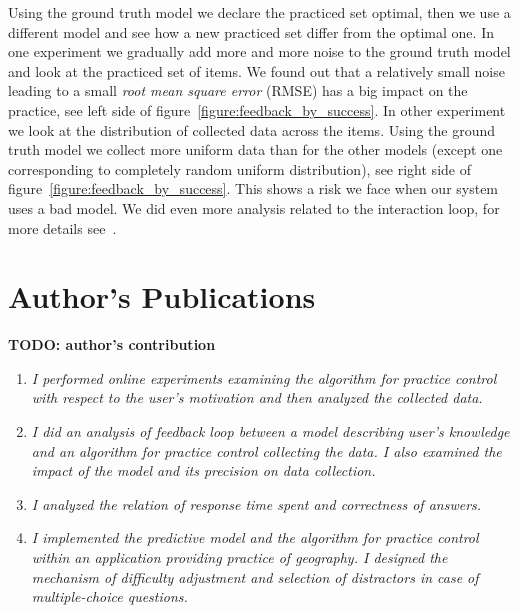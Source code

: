 \documentclass[table,color,cover,twoside,nolot,nolof]{fithesis3/fithesis3}
\begin{document}
Using the ground truth model we declare the practiced set
optimal, then we use a different model and see how a new practiced set
differ from the optimal one. In one experiment we gradually add more and more
noise to the ground truth model and look at the practiced set of items. We
found out that a relatively small noise leading to a small \emph{root mean
square error} (RMSE) has a big impact on the practice, see left side of
figure~\ref{figure:feedback_by_success}. In other experiment we look at the
distribution of collected data across the items. Using the ground truth model
we collect more uniform data than for the other models (except one
corresponding to completely random uniform distribution), see right side of
figure~\ref{figure:feedback_by_success}. This shows a risk we face when our
system uses a bad model. We did even more analysis related to the interaction
loop, for more details see~\cite{niznan2015exploring}.

\chapter{Author's Publications}

\textbf{TODO: author's contribution}

\begin{enumerate}
	\item {}

		\textit{I performed online experiments examining the algorithm for practice
			control with respect to the user's motivation and then analyzed the collected
			data.}
	\item {}

		\textit{I did an analysis of feedback loop between a model describing
			user's knowledge and an algorithm for practice control collecting the
			data. I also examined the impact of the model and its precision on data
			collection.}
	\item {}

		\textit{I analyzed the relation of response time spent  and correctness of answers.}

	\item {}

		\textit{I implemented the predictive model and the algorithm for practice
			control within an application providing practice of geography. I designed
			the mechanism of difficulty adjustment and selection of distractors in case of
			multiple-choice questions.}
\end{enumerate}
\end{document}
